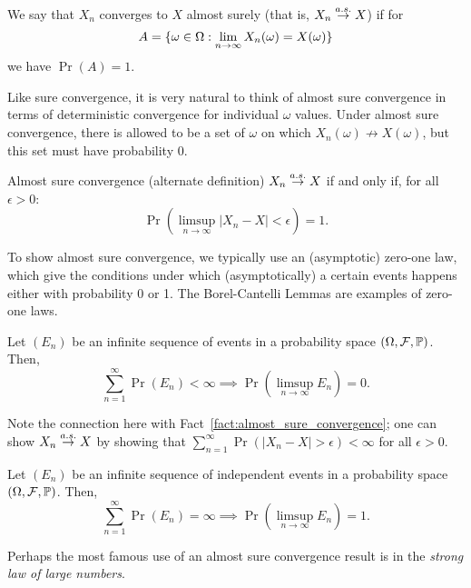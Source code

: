 \begin{definition}
    We say that $X_n$ converges to $X$ almost surely (that is, $X_n \overset{a.s.}{\rightarrow} X$)
    if for
    \[
        A = \{ \omega \in \Omega: \lim_{n \rightarrow \infty} X_n(\omega) = X(\omega) \}
    \]
    we have $\Pr(A) = 1$.
\end{definition}

Like sure convergence, it is very natural to think of almost sure convergence 
in terms of deterministic convergence for individual $\omega$ values.
Under almost sure convergence, there is 
allowed to be a set of $\omega$ on which $X_n(\omega) \not\rightarrow X(\omega)$,
but this set must have probability 0.

\begin{fact}{Almost sure convergence (alternate definition)}
    \label{fact:almost_sure_convergence}
    $X_n \overset{a.s.}{\rightarrow} X$ if and only if, for all $\epsilon > 0$:
    \[
        \Pr \left( \limsup_{n \rightarrow \infty} |X_n - X| < \epsilon \right)
        =
        1.
    \]
\end{fact}

To show almost sure convergence, we typically use an (asymptotic) zero-one law,
which give the conditions under which (asymptotically) a certain events happens 
either with probability 0 or 1. The Borel-Cantelli Lemmas are examples of 
zero-one laws.

\begin{lemma}
    Let $(E_n)$ be an infinite sequence of events in a probability space 
    $(\Omega, \mathcal F, \operatorname*{\mathbb{P}})$. Then, 
    \[
        \sum_{n=1}^{\infty} \Pr(E_n) < \infty
        \implies 
        \Pr \left( \limsup_{n \rightarrow \infty} E_n \right) = 0.
    \]
\end{lemma}

Note the connection here with Fact~\ref{fact:almost_sure_convergence};
one can show $X_n \overset{a.s.}{\rightarrow} X$ by showing that 
$\sum_{n=1}^{\infty} \Pr \left( |X_n - X| > \epsilon \right) < \infty$
for all $\epsilon > 0$.


\begin{lemma}
    Let $(E_n)$ be an infinite sequence of independent events in a 
    probability space $(\Omega, \mathcal F, \operatorname*{\mathbb{P}})$. Then,
    \[
        \sum_{n=1}^{\infty} \Pr(E_n) = \infty
        \implies 
        \Pr \left( \limsup_{n \rightarrow \infty} E_n \right) = 1.
    \]
\end{lemma}

Perhaps the most famous use of an almost sure convergence result is in the 
\emph{strong law of large numbers}.

